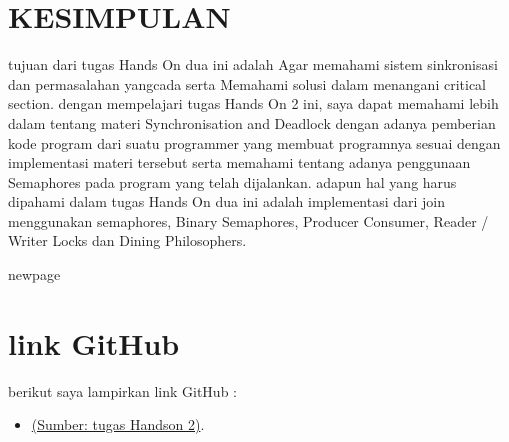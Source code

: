 \documentclass[11pt,a4paper]{article}
\begin{document}
\section{KESIMPULAN}
tujuan dari tugas Hands On dua ini adalah Agar memahami sistem sinkronisasi dan permasalahan yangcada serta Memahami solusi dalam menangani critical section. dengan mempelajari tugas Hands On 2 ini, saya dapat memahami lebih dalam tentang materi Synchronisation and Deadlock dengan adanya pemberian kode program dari suatu programmer yang membuat programnya sesuai dengan implementasi materi tersebut serta memahami tentang adanya penggunaan Semaphores pada program yang telah dijalankan. adapun hal yang harus dipahami dalam tugas Hands On dua ini adalah implementasi dari join menggunakan semaphores, Binary Semaphores, Producer Consumer, Reader / Writer Locks dan Dining Philosophers.




newpage
\section{link GitHub}
    berikut saya lampirkan link GitHub :
\begin{itemize}
    \item \href{https://github.com/irwantoYS/Sistem-Operasi-Hands-On-2}{(Sumber: tugas Handson 2)}.
\end{itemize}
\end{document}
